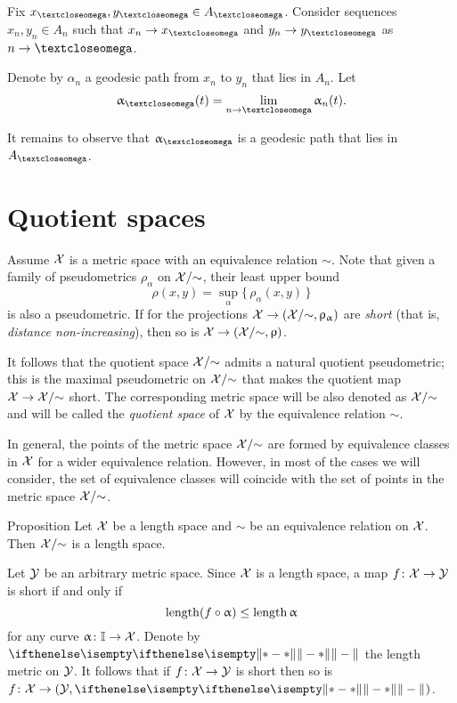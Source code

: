 Fix $x_\o,y_\o\in A_\o$.
Consider sequences $x_n,y_n\in A_n$ such that $x_n\to x_\o$ and $y_n\to y_\o$ as $n\to\o$.

Denote by $\alpha_n$ a geodesic path from $x_n$ to $y_n$ that lies in $A_n$.
Let
\[\alpha_\o(t)=\lim_{n\to \o}\alpha_n(t).\]

It remains to observe that $\alpha_\o$ is a geodesic path that lies in $A_\o$.
\qeds

\section{Quotient spaces}\label{sec:quotient}

 Assume $\mathcal{X}$ is a metric space
with an equivalence relation $\sim$.
Note that given a family of pseudometrics $\rho_\alpha$ on $\mathcal{X}/{\sim}$,
their least upper bound
\[\rho(x,y)=\sup_\alpha\{\,\rho_\alpha(x,y)\,\}\]
is also a pseudometric.
If for the projections $\spc{X}\to(\spc{X}/{\sim},\rho_\alpha)$ are \emph{short} (that is, \textit{distance non-increasing}), then so is $\spc{X}\to(\spc{X}/{\sim},\rho)$.

It follows that 
the quotient space $\mathcal{X}/{\sim}$ admits a natural quotient pseudometric;
this is the maximal pseudometric on  $\mathcal{X}/{\sim}$ 
that makes the quotient map 
$\spc{X}\to\spc{X}/{\sim}$ short.
The corresponding metric space will be also denoted as $\mathcal{X}/{\sim}$
and will be called the \emph{quotient space} of $\mathcal{X}$ by the equivalence relation $\sim$.

In general, the points of the metric space $\mathcal{X}/{\sim}$
are formed by equivalence classes in $\mathcal{X}$
for a wider equivalence relation.
However, in most of the cases we will consider, 
the set of equivalence classes will coincide with the set of points in the metric space $\mathcal{X}/{\sim}$.



\begin{thm}{Proposition}\label{prop:length-X}
Let $\mathcal{X}$ be a length space and 
$\sim$ be an equivalence relation on $\mathcal{X}$. Then $\mathcal{X}/{\sim}$
is a length space.
\end{thm}

Let $\mathcal{Y}$ be an arbitrary metric space.
Since $\mathcal{X}$ is a length space,
a map $f\:\spc{X}\to \spc{Y}$ is short if and only if 
\[\length(f\circ\alpha)\le \length\alpha\]
for any curve
$\alpha\:\II\to \spc{X}$.
Denote by $\yetdist{}{}{}$ the length metric on $\mathcal{Y}$.
It follows that if $f\:\spc{X}\to \spc{Y}$ is short
then so is 
$f\:\spc{X}\to (\spc{Y},\yetdist{}{}{})$.

